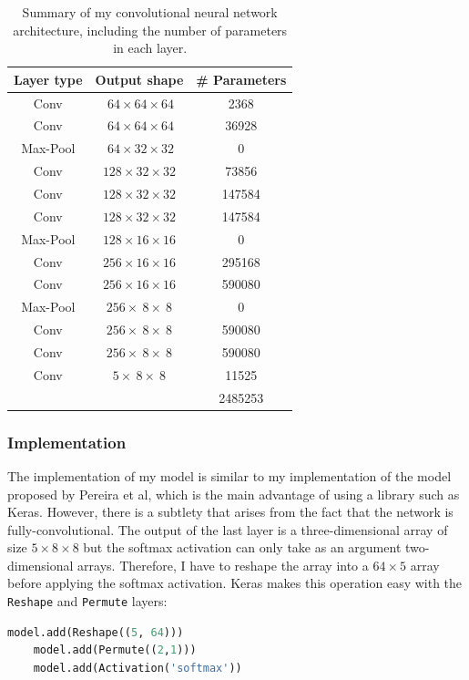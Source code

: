 \documentclass[12pt,a4paper,twoside,openright]{report}
\begin{document}
\begin{table}[h]
\centering	
\begin{tabular}{ c c S[table-format=7.0] } 
\textbf{Layer type} & \textbf{Output shape} & \textbf{\# Parameters} \\
 \hline
 Conv 		& $\ 64 	\times 64 	\times 64$ 	& 2368 \\ 
 Conv 		& $\ 64 	\times 64 	\times 64$ 	& 36928 \\ 
Max-Pool 	& $\ 64 	\times 32 	\times 32$ 	& 0\\
 Conv 		& $128 		\times 32 	\times 32$	& 73856 \\ 
 Conv 		& $128 		\times 32 	\times 32$ 	& 147584 \\ 
 Conv 		& $128 		\times 32 	\times 32$ 	& 147584 \\ 
Max-Pool 	& $128 		\times 16 	\times 16$	& 0\\
 Conv 		& $256 		\times 16 	\times 16$ 	& 295168 \\ 
 Conv 		& $256 		\times 16 	\times 16$ 	& 590080 \\ 
Max-Pool 	& $256 		\times\ 8 	\times\ 8$	& 0\\
 Conv 		& $256 		\times\ 8 	\times\ 8$	& 590080 \\ 
 Conv 		& $256 		\times\ 8 	\times\ 8$ 	& 590080 \\ 
 Conv 		& $5 		\times\ 8 	\times\ 8$ 	& 11525 \\ 
\hhline{~~=}
\rule{0pt}{3ex}    
&& 2485253\\
\end{tabular}
\caption[Summary of my convolutional neural network architecture, including the number of parameters in each layer.]{Summary of my convolutional neural network architecture, including the number of parameters in each layer.}
\label{table:my_model}
\end{table}

\subsubsection{Implementation}
The implementation of my model is similar to my implementation of the model proposed by Pereira et al, which is the main advantage of using a library such as Keras. However, there is a subtlety that arises from the fact that the network is fully-convolutional. The output of the last layer is a three-dimensional array of size $5 \times 8 \times 8$ but the softmax activation can only take as an argument two-dimensional arrays. Therefore, I have to reshape the array into a $64 \times 5$ array before applying the softmax activation. Keras makes this operation easy with the \texttt{Reshape} and \texttt{Permute} layers:
\begin{lstlisting}[language=Python]
	model.add(Reshape((5, 64)))
	model.add(Permute((2,1)))
	model.add(Activation('softmax'))
\end{lstlisting}
\end{document}
